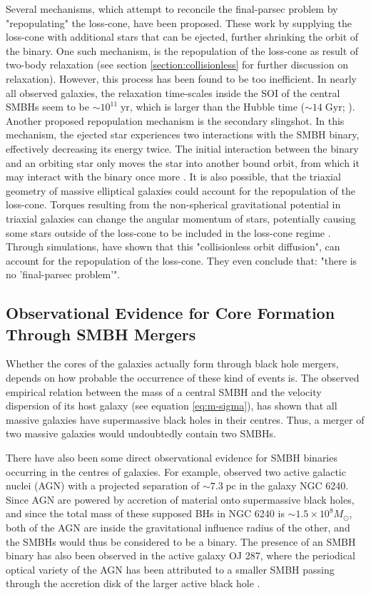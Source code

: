 \documentclass[english, twoside]{HYgradu}
\begin{document}
Several mechanisms, which attempt to reconcile the final-parsec problem by "repopulating" the loss-cone, have been proposed. These work by supplying the loss-cone with additional stars that can be ejected, further shrinking the orbit of the binary. One such mechanism, is the repopulation of the loss-cone as result of two-body relaxation (see section \ref{section:collisionless} for further discussion on relaxation). However, this process has been found to be too inefficient. In nearly all observed galaxies, the relaxation time-scales inside the SOI of the central SMBHs seem to be $\sim 10^{11} \; \mathrm{yr}$, which is larger than the Hubble time ($\sim 14 \; \mathrm{Gyr}$; \citealt{Faber1997, Milosavljevic2001}). Another proposed repopulation mechanism is the secondary slingshot. In this mechanism, the ejected star experiences two interactions with the SMBH binary, effectively decreasing its energy twice. The initial interaction between the binary and an orbiting star only moves the star into another bound orbit, from which it may interact with the binary once more \citep{MerrittBook}. It is also possible, that the triaxial geometry of massive elliptical galaxies could account for the repopulation of the loss-cone. Torques resulting from the non-spherical gravitational potential in triaxial galaxies can change the angular momentum of stars, potentially causing some stars outside of the loss-cone to be included in the loss-cone regime \citep{MerrittBook, Gualandris2017}. Through simulations, \cite{Gualandris2017} have shown that this "collisionless orbit diffusion", can account for the repopulation of the loss-cone. They even conclude that: "there is no 'final-parsec problem'".

\subsection{Observational Evidence for Core Formation Through SMBH Mergers}

Whether the cores of the galaxies actually form through black hole mergers, depends on how probable the occurrence of these kind of events is. The observed empirical relation between the mass of a central SMBH and the velocity dispersion of its host galaxy (see equation \ref{eq:m-sigma}), has shown that all massive galaxies have supermassive black holes in their centres. Thus, a merger of two massive galaxies would undoubtedly contain two SMBHs. 

There have also been some direct observational evidence for SMBH binaries occurring in the centres of galaxies. For example, \cite{Rodriguez2006} observed two active galactic nuclei (AGN) with a projected separation of $\sim 7.3 \; \mathrm{pc}$ in the galaxy NGC 6240. Since AGN are powered by accretion of material onto supermassive black holes, and since the total mass of these supposed BHs in NGC 6240 is $\sim 1.5 \times 10^8 M_\odot$, both of the AGN are inside the gravitational influence radius of the other, and the SMBHs would thus be considered to be a binary. The presence of an SMBH binary has also been observed in the active galaxy OJ 287, where the periodical optical variety of the AGN has been attributed to a smaller SMBH passing through the accretion disk of the larger active black hole \citep{MerrittBook}.
\end{document}
